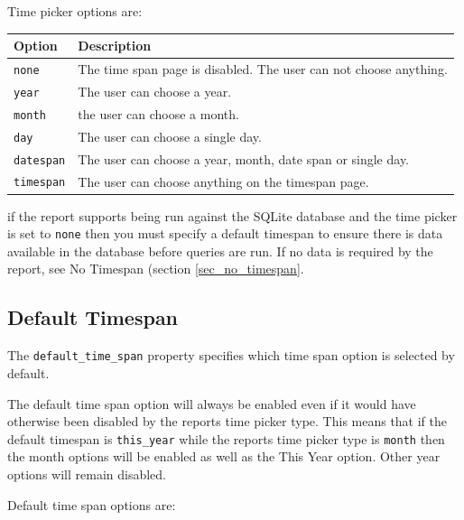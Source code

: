 \documentclass[a4paper,10pt]{book}
\begin{document}
Time picker options are:

\begin{tabular}{p{2.5cm} l}
\hline
\textbf{Option} & \textbf{Description} \\
\hline
\verb|none| & The time span page is disabled. The user can not choose anything.\\
\verb|year| & The user can choose a year.\\
\verb|month| & the user can choose a month.\\
\verb|day| & The user can choose a single day.\\
\verb|datespan| & The user can choose a year, month, date span or single day.\\
\verb|timespan| & The user can choose anything on the timespan page. \\
\hline
\end{tabular}

if the report supports being run against the SQLite database and the time picker is set to \verb|none| then you must specify a default timespan to ensure there is data available in the database before queries are run. If no data is required by the report, see No Timespan (section \ref{sec_no_timespan}.

\subsection{Default Timespan}
The \verb|default_time_span| property specifies which time span option is selected by default. 

The default time span option will always be enabled even if it would have otherwise been disabled by the reports time picker type. This means that if the default timespan is \verb|this_year| while the reports time picker type is \verb|month| then the month options will be enabled as well as the This Year option. Other year options will remain disabled.


Default time span options are:
\end{document}
